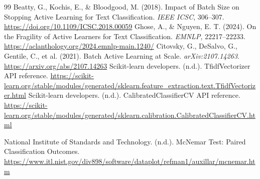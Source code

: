 \begin{thebibliography}{99}
 Beatty, G., Kochis, E., \& Bloodgood, M. (2018). Impact of Batch Size on Stopping Active Learning for Text Classification. \emph{IEEE ICSC}, 306--307. \url{https://doi.org/10.1109/ICSC.2018.00059}
 Ghose, A., \& Nguyen, E. T. (2024). On the Fragility of Active Learners for Text Classification. \emph{EMNLP}, 22217--22233. \url{https://aclanthology.org/2024.emnlp-main.1240/}
 Citovsky, G., DeSalvo, G., Gentile, C., et al. (2021). Batch Active Learning at Scale. \emph{arXiv:2107.14263}. \url{https://arxiv.org/abs/2107.14263}
 Scikit-learn developers. (n.d.). TfidfVectorizer API reference. \url{https://scikit-learn.org/stable/modules/generated/sklearn.feature_extraction.text.TfidfVectorizer.html}
 Scikit-learn developers. (n.d.). CalibratedClassifierCV API reference. \url{https://scikit-learn.org/stable/modules/generated/sklearn.calibration.CalibratedClassifierCV.html}

 National Institute of Standards and Technology. (n.d.). McNemar Test: Paired Classification Outcomes. \url{https://www.itl.nist.gov/div898/software/dataplot/refman1/auxillar/mcnemar.htm}
\end{thebibliography}
